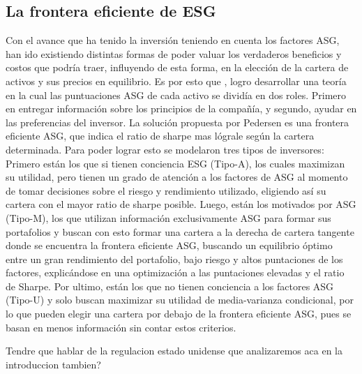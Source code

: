\vspace{0.5cm}

\subsection{La frontera eficiente de ESG}


Con el avance que ha tenido la inversión teniendo en cuenta los factores ASG, han ido existiendo distintas formas de poder valuar los verdaderos beneficios y costos que podría traer, influyendo de esta forma, en la elección de la cartera de activos y sus precios en equilibrio. Es por esto que , logro desarrollar una teoría en la cual las puntuaciones ASG de cada activo se dividía en dos roles. Primero en entregar información sobre los principios de la compañía, y segundo, ayudar en las preferencias del inversor. La solución propuesta por Pedersen es una frontera eficiente ASG, que indica el ratio de sharpe mas lógrale según la cartera determinada. Para poder lograr esto se modelaron tres tipos de inversores:  Primero están los que si tienen conciencia ESG (Tipo-A), los cuales maximizan su utilidad, pero tienen un grado de atención a los factores de ASG al momento de tomar decisiones sobre el riesgo y rendimiento utilizado, eligiendo así su cartera con el mayor ratio de sharpe posible. Luego, están los motivados por ASG (Tipo-M), los que utilizan información exclusivamente ASG para formar sus portafolios y buscan con esto formar una cartera a la derecha de cartera tangente donde se encuentra la frontera eficiente ASG, buscando un equilibrio óptimo entre un gran rendimiento del portafolio, bajo riesgo y altos puntaciones de los factores, explicándose en una optimización a las puntaciones elevadas y el ratio de Sharpe. Por ultimo, están los que no tienen conciencia a los factores ASG (Tipo-U) y solo buscan maximizar su utilidad de media-varianza condicional, por lo que pueden elegir una cartera por debajo de la frontera eficiente ASG, pues se basan en menos información sin contar estos criterios.

\vspace{0.5cm}

Tendre que hablar de la regulacion estado unidense que analizaremos aca en la introduccion tambien?
